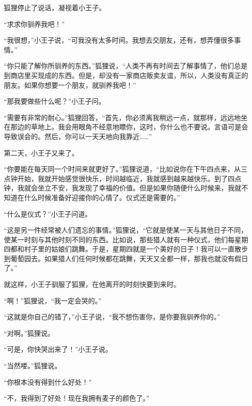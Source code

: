 狐狸停止了说话，凝视着小王子。

“求求你驯养我吧！”

“我很想，”小王子说，“可我没有太多时间。我想去交朋友，还有，想弄懂很多事情。”

“你只能了解你所驯养的东西。”狐狸说，“人类不再有时间去了解事情了，他们总是到商店里买现成的东西。但是，却没有一家商店贩卖友谊，所以，人类没有真正的朋友。如果你想要一个朋友，就驯养我吧！”

{\startalignment[center]
 \stopalignment}

“那我要做些什么呢？”小王子问。

“需要有非常的耐心。”狐狸回答，“首先，你必须离我稍远一点，就那样，远远地坐在那边的草地上。我会用眼角不经意地瞟你，这时，你什么也不要说。言语可是会导致误会的。然后，你可以一天天地向我靠近\ldots{}\ldots{}”

第二天，小王子又来了。

“你要能在每天同一个时间来就更好了。”狐狸说道，“比如说你在下午四点来，从三点钟开始，我就开始感觉很快乐，时间越临近，我就感到越来越快乐。到了四点钟，我就会坐立不安，我发现了幸福的价值。但是如果你随便什么时候来，我就不知道在什么时候准备好迎接你的心情了。仪式还是需要的。”

“什么是仪式？”小王子问道。

“这是另一件经常被人们遗忘的事情。”狐狸说，“它就是使某一天与其他日子不同，使某一时刻与其他时刻不同的东西。比如说，那些猎人就有一种仪式，他们每星期四都和村子里的姑娘们跳舞。于是，星期四就是一个美好的日子！我可以一直散步到葡萄园去。如果猎人们任何时候都在跳舞，天天又全都一样，那我也就没有假日了。”

{\startalignment[center]
 \stopalignment}

就这样，小王子驯服了狐狸，在他离开的时刻快要到来时。

“啊！”狐狸说，“我一定会哭的。”

“这就是你自己的错了，”小王子说，“我不想伤害你，是你要我驯养你的。”

“对啊。”狐狸说。

“可是，你快哭出来了！”小王子说。

“当然喽。”狐狸说。

“你根本没有得到什么好处！”

“不，我得到了好处！现在我拥有麦子的颜色了。”

